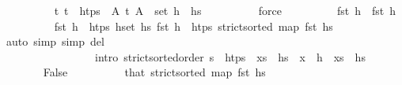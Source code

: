 \begin{isabellebody}
\ \ \ \ \ \ \ \ \isamarkupfalse%
\ {\isacartoucheopen}{\isasymAnd}t{\isachardot}{\kern0pt}\ t\ {\isasymin}\ htps\ {\isasymLongrightarrow}\ {\isasymexists}A{\isachardot}{\kern0pt}\ {\isacharparenleft}{\kern0pt}t{\isacharcomma}{\kern0pt}\ A{\isacharparenright}{\kern0pt}\ {\isasymin}\ set\ {\isacharparenleft}{\kern0pt}h\ {\isacharhash}{\kern0pt}\ hs{}{\isacharparenright}{\kern0pt}{\isacartoucheclose}\isanewline
\ \ \ \ \ \ \ \ \isamarkupfalse%
\ force\isanewline
\ \ \ \ \ \ \isamarkupfalse%
\ \isamarkupfalse%
\ {\isachardoublequoteopen}fst\ h{}{\isacharprime}{\kern0pt}\ {\isacharequal}{\kern0pt}\ fst\ h{\isachardoublequoteclose}\isanewline
\ \ \ \ \ \ \ \ \isamarkupfalse%
\ {\isacartoucheopen}fst\ h{}{\isacharprime}{\kern0pt}\ {\isasymin}\ htps{\isacartoucheclose}\ {\isacartoucheopen}{\isasymforall}h{\isasymin}set\ hs{}{\isachardot}{\kern0pt}\ fst\ h\ {\isasymnotin}\ htps{\isacartoucheclose}\ {\isacartoucheopen}strict{\isacharunderscore}{\kern0pt}sorted\ {\isacharparenleft}{\kern0pt}map\ fst\ hs{\isacharparenright}{\kern0pt}{\isacartoucheclose}\isanewline
\ \ \ \ \ \ \ \ \isamarkupfalse%
\ {\isacharparenleft}{\kern0pt}auto\ simp{\isacharcolon}{\kern0pt}\ simp\ del{\isacharcolon}{\kern0pt}\ {\isacharasterisk}{\kern0pt}\isanewline
\ \ \ \ \ \ \ \ \ \ \ \ \ \ \ \ \ intro{\isacharbang}{\kern0pt}{\isacharcolon}{\kern0pt}\ strict{\isacharunderscore}{\kern0pt}sorted{\isacharunderscore}{\kern0pt}order{\isacharbrackleft}{\kern0pt}\ s\ {\isacharequal}{\kern0pt}\ htps\ \ {\isacharquery}{\kern0pt}xs{}{\isachardot}{\kern0pt}{}\ {\isacharequal}{\kern0pt}\ {\isachardoublequoteopen}hs{}{\isachardoublequoteclose}\ \ {\isacharquery}{\kern0pt}x{}{\isachardot}{\kern0pt}{}\ {\isacharequal}{\kern0pt}\ {\isachardoublequoteopen}h{}{\isachardoublequoteclose}\ \ {\isacharquery}{\kern0pt}xs{}{\isachardot}{\kern0pt}{}\ {\isacharequal}{\kern0pt}\ {\isachardoublequoteopen}hs{}{\isachardoublequoteclose}{\isacharbrackright}{\kern0pt}{\isacharparenright}{\kern0pt}{\isacharplus}{\kern0pt}\isanewline
\ \ \ \ \ \ \isamarkupfalse%
\ False\isanewline
\ \ \ \ \ \ \ \ \isamarkupfalse%
\ that\ {\isacartoucheopen}strict{\isacharunderscore}{\kern0pt}sorted\ {\isacharparenleft}{\kern0pt}map\ fst\ hs{\isacharprime}{\kern0pt}{\isacharparenright}{\kern0pt}{\isacartoucheclose}\isanewline

\end{isabellebody}
